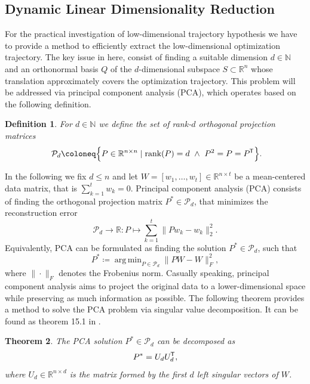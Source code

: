 \documentclass[11pt, a4paper]{article}
\newtheorem{theorem}{Theorem}[section]
\newtheorem{definition}[theorem]{Definition}
\newcommand{\N}{\mathbb{N}}
\newcommand{\R}{\mathbb{R}}
\renewcommand{\P}{\mathcal{P}}
\newcommand*{\tr}{^{\mkern-1.5mu\mathsf{T}}}
\DeclareMathOperator*{\argmin}{arg\,min}
\begin{document}
\subsection{Dynamic Linear Dimensionality Reduction}

For the practical investigation of low-dimensional trajectory hypothesis we have to provide a method to efficiently extract the low-dimensional optimization trajectory. The key issue in here, consist of finding a suitable dimension $d \in \N$ and an orthonormal basis $Q$ of the $d$-dimensional subspace $S \subset \R^n$ whose translation approximately covers the optimization trajectory. This problem will be addressed via principal component analysis (PCA), which operates based on the following definition.

\begin{definition}
For $d \in \N$ we define the set of rank-$d$ orthogonal projection matrices
\[ \P_d \coloneq \Big \{ P \in \R^{n \times n} \mid \text{rank}(P) = d \ \wedge \ P^2 = P = P\tr  \Big \}. \]
\end{definition}

In the following we fix $d \leq n$ and let $W = [w_1, \dots, w_t] \in \R^{n \times t}$ be a mean-centered data matrix, that is $\sum_{k=1}^{t}w_k=0$. Principal component analysis (PCA) consists of finding the orthogonal projection matrix $P^* \in \P_d$, that minimizes the reconstruction error
\[ \P_d \to \R : P \mapsto \sum_{k=1}^{t} \big \| Pw_k - w_k \big \|_2^2. \]
Equivalently, PCA can be formulated as finding the solution $P^* \in \P_d$, such that
\[ P^* \coloneq \argmin_{P \in \P_d} \big \| PW - W \big \|_F^2, \]
where $\| \cdot \|_F$ denotes the Frobenius norm. Casually speaking, principal component analysis aims to project the original data to a lower-dimensional space while preserving as much information as possible. The following theorem provides a method to solve the PCA problem via singular value decomposition. It can be found as theorem 15.1 in \cite{PCA}.

\begin{theorem} \label{thm:pca}
The PCA solution $P^* \in \P_d$ can be decomposed as
\[ P^* = U_dU_d\tr , \]
where $U_d \in \R^{n \times d}$ is the matrix formed by the first $d$ left singular vectors of $W$.
\end{theorem}
\end{document}
